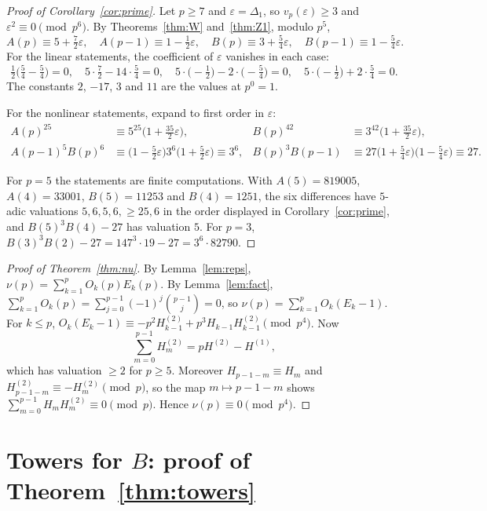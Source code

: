 \documentclass[11pt]{amsart}
\theoremstyle{definition}
\theoremstyle{remark}
\newcommand{\vp}{v_p}
\begin{document}
\begin{proof}[Proof of Corollary~\ref{cor:prime}]
Let $p\ge7$ and $\varepsilon=\Delta_1$, so $\vp(\varepsilon)\ge3$ and $\varepsilon^2\equiv0\pmod{p^6}$.
By Theorems~\ref{thm:W} and~\ref{thm:Z1}, modulo $p^5$,
\[
A(p)\equiv5+\tfrac72\varepsilon,\quad A(p-1)\equiv1-\tfrac12\varepsilon,\quad
B(p)\equiv3+\tfrac54\varepsilon,\quad B(p-1)\equiv1-\tfrac54\varepsilon .
\]
For the linear statements, the coefficient of $\varepsilon$ vanishes in each case:
\[
\tfrac12\bigl(\tfrac54-\tfrac54\bigr)=0,\quad
5\cdot\tfrac72-14\cdot\tfrac54=0,\quad
5\cdot\bigl(-\tfrac12\bigr)-2\cdot\bigl(-\tfrac54\bigr)=0,\quad
5\cdot\bigl(-\tfrac12\bigr)+2\cdot\tfrac54=0 .
\]
The constants $2$, $-17$, $3$ and $11$ are the values at $p^0=1$.

For the nonlinear statements, expand to first order in $\varepsilon$:
\begin{align*}
A(p)^{25}&\equiv5^{25}\bigl(1+\tfrac{35}2\varepsilon\bigr), &
B(p)^{42}&\equiv3^{42}\bigl(1+\tfrac{35}2\varepsilon\bigr),\\
A(p-1)^5B(p)^6&\equiv\bigl(1-\tfrac52\varepsilon\bigr)3^6\bigl(1+\tfrac52\varepsilon\bigr)\equiv3^6, &
B(p)^3B(p-1)&\equiv27\bigl(1+\tfrac54\varepsilon\bigr)\bigl(1-\tfrac54\varepsilon\bigr)\equiv27 .
\end{align*}

For $p=5$ the statements are finite computations. With $A(5)=819005$, $A(4)=33001$,
$B(5)=11253$ and $B(4)=1251$, the six differences have $5$-adic valuations
$5,6,5,6,\ge25,6$ in the order displayed in Corollary~\ref{cor:prime}, and
$B(5)^3B(4)-27$ has valuation $5$. For $p=3$, $B(3)^3B(2)-27=147^3\cdot19-27=3^6\cdot 82790$.
\end{proof}

\begin{proof}[Proof of Theorem~\ref{thm:nu}]
By Lemma~\ref{lem:reps}, $\nu(p)=\sum_{k=1}^pO_k(p)E_k(p)$. By Lemma~\ref{lem:fact},
$\sum_{k=1}^pO_k(p)=\sum_{j=0}^{p-1}(-1)^j\binom{p-1}j=0$, so
$\nu(p)=\sum_{k=1}^{p}O_k(E_k-1)$. For $k\le p$,
$O_k(E_k-1)\equiv -p^2H^{(2)}_{k-1}+p^3H_{k-1}H^{(2)}_{k-1}\pmod{p^4}$. Now
\[
\sum_{m=0}^{p-1}H^{(2)}_m=pH^{(2)}-H^{(1)},
\]
which has valuation $\ge2$ for $p\ge5$. Moreover $H_{p-1-m}\equiv H_m$ and
$H^{(2)}_{p-1-m}\equiv-H^{(2)}_m\pmod p$, so the map $m\mapsto p-1-m$ shows
$\sum_{m=0}^{p-1}H_mH^{(2)}_m\equiv0\pmod p$. Hence $\nu(p)\equiv0\pmod{p^4}$.
\end{proof}

\section{Towers for \texorpdfstring{$B$}{B}: proof of Theorem~\ref{thm:towers}}
\end{document}
